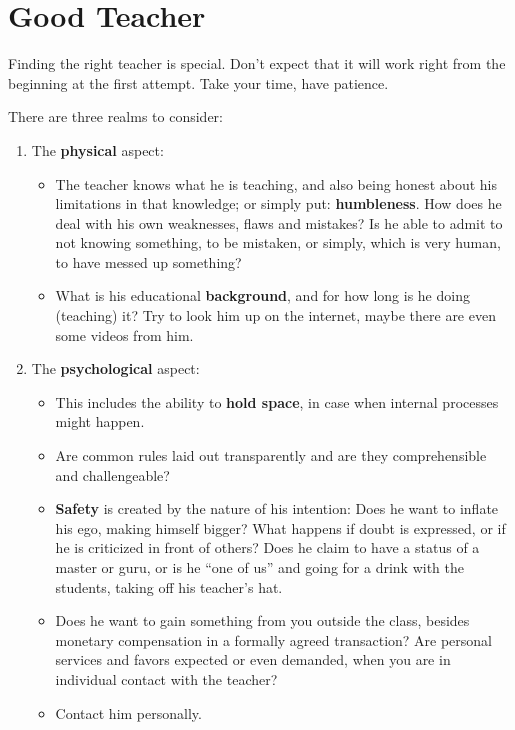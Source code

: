 \section{Good Teacher}\label{sec:good-teacher}

Finding the right teacher is special.
Don’t expect that it will work right from the beginning at the first attempt.
Take your time, have patience.

There are three realms to consider:

\begin{enumerate}
    \item The \textbf{physical} aspect:
    \begin{itemize}
        \item The teacher knows what he is teaching, and also being honest about his limitations in that knowledge; or simply put: \textbf{humbleness}.
        How does he deal with his own weaknesses, flaws and mistakes?
        Is he able to admit to not knowing something, to be mistaken, or simply, which is very human, to have messed up something?
        \item What is his educational \textbf{background}, and for how long is he doing (teaching) it?
        Try to look him up on the internet, maybe there are even some videos from him.
    \end{itemize}
    \item The \textbf{psychological} aspect:
    \begin{itemize}
        \item This includes the ability to \textbf{hold space}, in case when internal processes might happen.
        \item Are common rules laid out transparently and are they comprehensible and challengeable?
        \item \textbf{Safety} is created by the nature of his intention: Does he want to inflate his ego, making himself bigger?
		What happens if doubt is expressed, or if he is criticized in front of others?
        Does he claim to have a status of a master or guru, or is he ``one of us'' and going for a drink with the students, taking off his teacher's hat.
        \item Does he want to gain something from you outside the class, besides monetary compensation in a formally agreed transaction?
        Are personal services and favors expected or even demanded, when you are in individual contact with the teacher?
        \item Contact him personally.

\end{itemize}
\end{enumerate}
